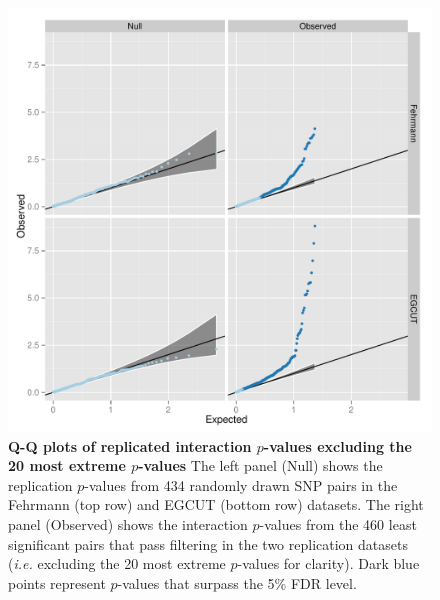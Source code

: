 \documentclass{article}
\begin{document}
\begin{figure}
	\includegraphics[width=5in]{qqfdr}
	\caption{\textbf{Q-Q plots of replicated interaction $p$-values excluding the 20 most extreme $p$-values} The left panel (Null) shows the replication $p$-values from 434 randomly drawn SNP pairs in the Fehrmann (top row) and EGCUT (bottom row) datasets. The right panel (Observed) shows the interaction $p$-values from the 460 least significant pairs that pass filtering in the two replication datasets (\emph{i.e.} excluding the 20 most extreme $p$-values for clarity). Dark blue points represent $p$-values that surpass the 5\% FDR level.}
\label{fig:qqplotfdr}
\end{figure}
\clearpage
\end{document}
